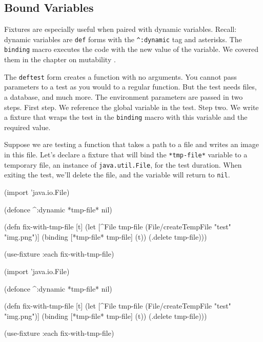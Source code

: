 \subsection{Bound Variables}


Fixtures are especially useful when paired with dynamic variables. Recall: dynamic variables are \verb|def| forms with the \verb|^:dynamic| tag and asterisks. The \verb|binding| macro executes the code with the new value of the variable. We covered them in the chapter on mutability .

The \verb|deftest| form creates a function with no arguments. You cannot pass parameters to a test as you would to a regular function. But the test needs files, a database, and much more. The environment parameters are passed in two steps. First step. We reference the global variable in the test. Step two. We write a fixture that wraps the test in the \verb|binding| macro with this variable and the required value.

Suppose we are testing a function that takes a path to a file and writes an image in this file. Let's declare a fixture that will bind the \verb|*tmp-file*| variable to a temporary file, an instance of \verb|java.util.File|, for the test duration. When exiting the test, we'll delete the file, and the variable will return to \verb|nil|.


\ifnarrow

\begin{english}
  \begin{clojure}
(import 'java.io.File)

(defonce ^:dynamic *tmp-file* nil)

(defn fix-with-tmp-file [t]
  (let [^File tmp-file
        (File/createTempFile
          "test" "img.png")]
    (binding [*tmp-file* tmp-file]
      (t))
    (.delete tmp-file)))

(use-fixture :each fix-with-tmp-file)
  \end{clojure}
\end{english}

\else

\begin{english}
  \begin{clojure}
(import 'java.io.File)

(defonce ^:dynamic *tmp-file* nil)

(defn fix-with-tmp-file [t]
  (let [^File tmp-file (File/createTempFile "test" "img.png")]
    (binding [*tmp-file* tmp-file]
      (t))
    (.delete tmp-file)))

(use-fixture :each fix-with-tmp-file)
  \end{clojure}
\end{english}

